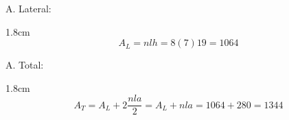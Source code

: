 {\begin{parts}
\begin{minipage}{.75\linewidth}
				A. Lateral:\\[-2em]
				\begin{solutionbox}{1.8cm}
					\[A_L=nlh=8(7)19= 1064\]
				\end{solutionbox}

				A. Total:\\[-2em]
				\begin{solutionbox}{1.8cm}
					\[A_T=A_L+2\dfrac{nla}{2}=A_L+nla=1064+280=1344\]
				\end{solutionbox}
			\end{minipage}
		\end{parts}
	}





					
					

				
